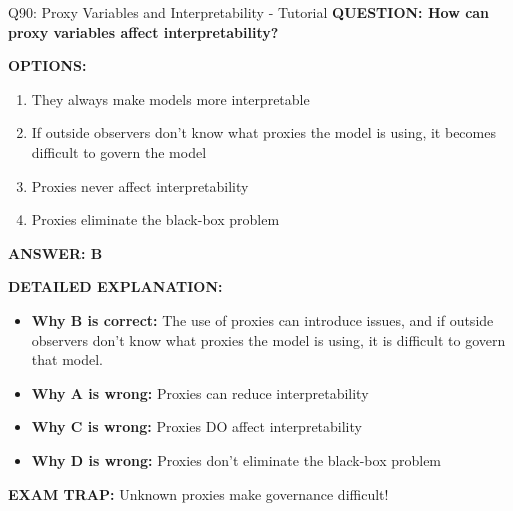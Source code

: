 \documentclass[8pt]{beamer}
\begin{document}
	\begin{frame}{Q90: Proxy Variables and Interpretability - Tutorial}
		\fontsize{6.5}{7.5}\selectfont
		\textbf{QUESTION: How can proxy variables affect interpretability?}
		
		\vspace{0.1cm}
		\textbf{OPTIONS:}
		\begin{enumerate}
			\item They always make models more interpretable
			\item If outside observers don't know what proxies the model is using, it becomes difficult to govern the model
			\item Proxies never affect interpretability
			\item Proxies eliminate the black-box problem
		\end{enumerate}
		
		\vspace{0.1cm}
		\textcolor{myblue}{\textbf{ANSWER: B}}
		
		\vspace{0.1cm}
		\textbf{DETAILED EXPLANATION:}
		\begin{itemize}
			\item \textbf{Why B is correct:} The use of proxies can introduce issues, and if outside observers don't know what proxies the model is using, it is difficult to govern that model.
			\item \textbf{Why A is wrong:} Proxies can reduce interpretability
			\item \textbf{Why C is wrong:} Proxies DO affect interpretability
			\item \textbf{Why D is wrong:} Proxies don't eliminate the black-box problem
		\end{itemize}
		
		\textcolor{myred}{\textbf{EXAM TRAP:}} Unknown proxies \textcolor{myblue}{make governance difficult}!
	\end{frame}
	
\end{document}
